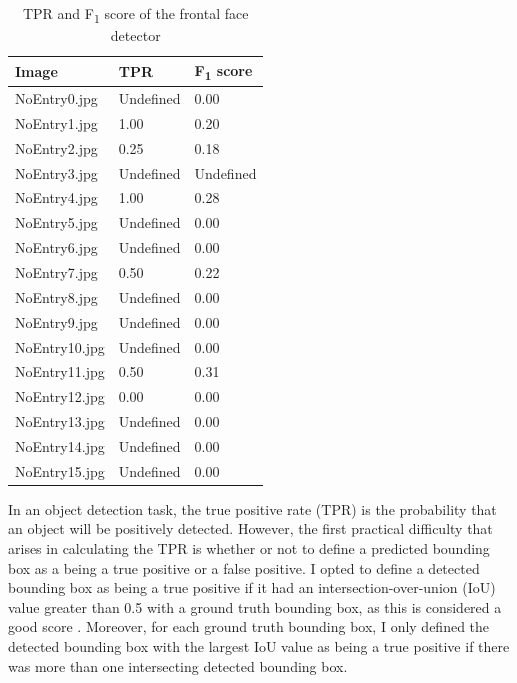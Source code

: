 \documentclass[onecolumn, 10pt, a4paper]{article}
\begin{document}
\begin{table}
  \vspace{-2.5em}
  \begin{center}
  \caption{TPR and F\textsubscript{1} score of the frontal face detector}\label{tab:face}
  \begin{tabular}{l | l l} 
    \hline\hline
    Image&TPR&F\textsubscript{1} score\\
    \hline
    NoEntry0.jpg&Undefined&0.00\\ 
    NoEntry1.jpg&1.00&0.20\\ 
    NoEntry2.jpg&0.25&0.18\\ 
    NoEntry3.jpg&Undefined&Undefined\\ 
    NoEntry4.jpg&1.00&0.28\\ 
    NoEntry5.jpg&Undefined&0.00\\ 
    NoEntry6.jpg&Undefined&0.00\\ 
    NoEntry7.jpg&0.50&0.22\\ 
    NoEntry8.jpg&Undefined&0.00\\ 
    NoEntry9.jpg&Undefined&0.00\\ 
    NoEntry10.jpg&Undefined&0.00\\ 
    NoEntry11.jpg&0.50&0.31\\ 
    NoEntry12.jpg&0.00&0.00\\ 
    NoEntry13.jpg&Undefined&0.00\\ 
    NoEntry14.jpg&Undefined&0.00\\ 
    NoEntry15.jpg&Undefined&0.00\\ 
    \hline
  \end{tabular}
  \end{center}
\end{table} 

In an object detection task, the true positive rate (TPR) is the probability that an object will be positively detected.
However, the first practical difficulty that arises in calculating the TPR is whether or not to define a predicted bounding box as a being a true positive or a false positive.
I opted to define a detected bounding box as being a true positive if it had an intersection-over-union (IoU) value greater than 0.5 with a ground truth bounding box, as this is considered a good score \cite{iou}.
Moreover, for each ground truth bounding box, I only defined the detected bounding box with the largest IoU value as being a true positive if there was more than one intersecting detected bounding box.
\end{document}
